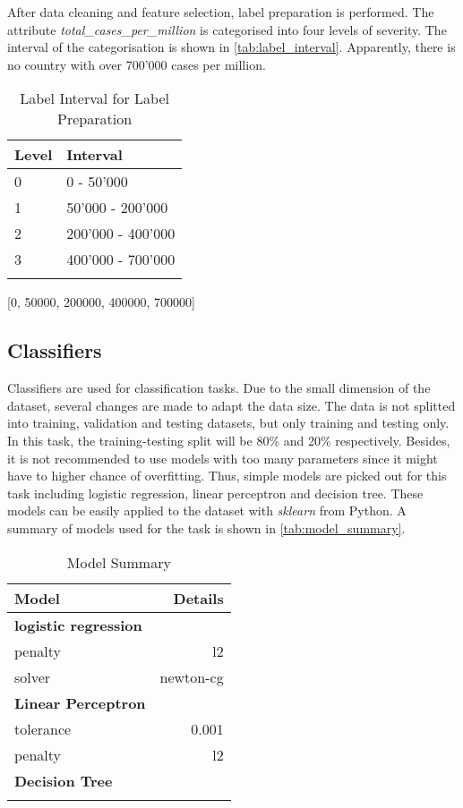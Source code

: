 \documentclass[10pt, a4paper, twocolumn]{article} %
\begin{document}
After data cleaning and feature selection, label preparation is performed. The attribute \emph{total\_cases\_per\_million} 
is categorised into four levels of severity. The interval of the categorisation is shown in \autoref{tab:label_interval}. 
Apparently, there is no country with over 700'000 cases per million. 
\begin{table}
	\caption{Label Interval for Label Preparation}
	\centering
	\begin{tabular}{ll}
		\toprule
		\textbf{Level} & \textbf{Interval} \\
		\midrule
		0 & 0 - 50'000 \\
		1 & 50'000 - 200'000 \\
		2 & 200'000 - 400'000 \\
		3 & 400'000 - 700'000\\
		\bottomrule
	\label{tab:label_interval}
	\end{tabular}
\end{table}
[0, 50000, 200000, 400000, 700000]
\subsection{Classifiers}
Classifiers are used for classification tasks. Due to the small dimension of the dataset, several changes are made to 
adapt the data size. The data is not splitted into training, validation and testing datasets, but only training and 
testing only. In this task, the training-testing split will be 80\% and 20\% respectively. Besides, it is not recommended 
to use models with too many parameters since it might have to higher chance of overfitting. Thus, simple models are 
picked out for this task including logistic regression, linear perceptron and decision tree. These models can be easily 
applied to the dataset with \emph{sklearn} from Python. A summary of models used for the task is shown in 
\autoref{tab:model_summary}.
\begin{table}
	\caption{Model Summary}
	\centering
	\begin{tabular}{lr}
		\toprule
		\textbf{Model} & \textbf{Details} \\
		\toprule
		\textbf{logistic regression} & \\ 
		penalty & l2 \\
		solver & newton-cg \\
		\midrule
		\textbf{Linear Perceptron} & \\
		tolerance & 0.001 \\
		penalty & l2 \\
		\midrule
		\textbf{Decision Tree} & \\
	\bottomrule
	\label{tab:model_summary}
	\end{tabular}
\end{table}
\end{document}
